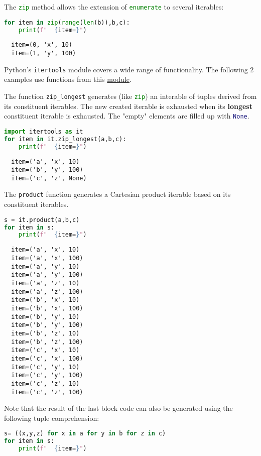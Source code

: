\documentclass[10pt]{article}
\begin{document}
\begin{itemize}
The \lstinline[language=python]{zip} method allows the extension of 
\lstinline[language=python]{enumerate} to several iterables:
\begin{lstlisting}[language=python]
for item in zip(range(len(b)),b,c):
    print(f"  {item=}")
\end{lstlisting}
\begin{verbatim}
  item=(0, 'x', 10)
  item=(1, 'y', 100)
\end{verbatim}  

Python's \lstinline[language=python]{itertools} module covers a wide range of functionality.
The following 2 examples use functions from this \href{https://docs.python.org/3/library/itertools.html#module-itertools}{module}.

The function \lstinline[language=python]{zip_longest} generates (like \lstinline[language=python]{zip}) 
an interable of tuples derived from its constituent
iterables. The new created iterable is exhausted when its \textbf{longest} constituent iterable is exhausted.
The "empty" elements are filled up with \lstinline[language=python]{None}.
\begin{lstlisting}[language=python]
import itertools as it
for item in it.zip_longest(a,b,c):
    print(f"  {item=}")
\end{lstlisting}
\begin{verbatim}
  item=('a', 'x', 10)
  item=('b', 'y', 100)
  item=('c', 'z', None)
\end{verbatim}

The \lstinline[language=python]{product} function generates a Cartesian product iterable based on its constituent iterables.
\begin{lstlisting}[language=python]
s = it.product(a,b,c)
for item in s:
    print(f"  {item=}")
\end{lstlisting}
\begin{verbatim}
  item=('a', 'x', 10)
  item=('a', 'x', 100)
  item=('a', 'y', 10)
  item=('a', 'y', 100)
  item=('a', 'z', 10)
  item=('a', 'z', 100)
  item=('b', 'x', 10)
  item=('b', 'x', 100)
  item=('b', 'y', 10)
  item=('b', 'y', 100)
  item=('b', 'z', 10)
  item=('b', 'z', 100)
  item=('c', 'x', 10)
  item=('c', 'x', 100)
  item=('c', 'y', 10)
  item=('c', 'y', 100)
  item=('c', 'z', 10)
  item=('c', 'z', 100)
\end{verbatim} 
Note that the result of the last block code can also be generated using the following tuple comprehension: 
\begin{lstlisting}[language=python]
s= ((x,y,z) for x in a for y in b for z in c)
for item in s:
    print(f"  {item=}")
\end{lstlisting}


\end{itemize}


\end{document}
